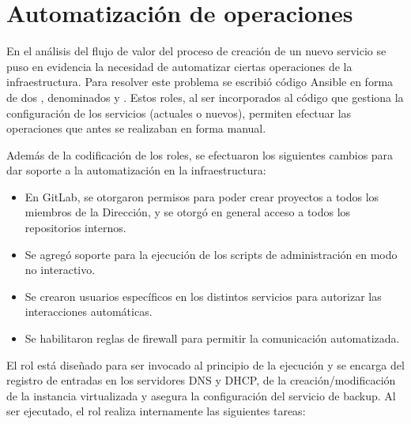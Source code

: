 \section{Automatización de operaciones}

En el análisis del flujo de valor del proceso de creación de un nuevo
servicio se puso en evidencia la necesidad de automatizar ciertas
operaciones de la infraestructura. Para resolver este problema se
escribió código Ansible en forma de dos , denominados
 y . Estos roles, al ser
incorporados al código que gestiona la configuración de los servicios
(actuales o nuevos), permiten efectuar las operaciones que antes se
realizaban en forma manual.

Además de la codificación de los roles, se efectuaron los siguientes
cambios para dar soporte a la automatización en la infraestructura:

\begin{itemize}
\item En GitLab, se otorgaron permisos para poder crear proyectos a
  todos los miembros de la Dirección, y se otorgó en general acceso a
  todos los repositorios internos.
\item Se agregó soporte para la ejecución de los scripts de
  administración en modo no interactivo.
\item Se crearon usuarios específicos en los distintos servicios para
  autorizar las interacciones automáticas.
\item Se habilitaron reglas de firewall para permitir la comunicación
  automatizada.
\end{itemize}
El rol  está diseñado para ser invocado al principio
de la ejecución y se encarga del registro de entradas en los
servidores DNS y DHCP, de la creación/modificación de la instancia
virtualizada y asegura la configuración del servicio de backup. Al ser
ejecutado, el rol realiza internamente las siguientes tareas:

